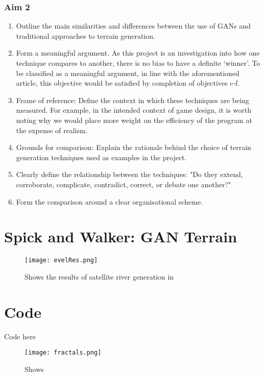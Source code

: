 \documentclass[a4paper]{report}
\begin{document}
\begin{appendices}
\subsubsection{Aim 2}
\begin{enumerate}
    \renewcommand{\theenumi}{\alph{enumi}}
    \item Outline the main similarities and differences between the use of GANs and traditional approaches to terrain generation.
    \item Form a meaningful argument. As this project is an investigation into how one technique compares to another, there is no bias to have a definite `winner'. To be classified as a meaningful argument, in line with the aforementioned article, this objective would be satisfied by completion of objectives c-f.
    \item Frame of reference: Define the context in which these techniques are being measured. For example, in the intended context of game design, it is worth noting why we would place more weight on the efficiency of the program at the expense of realism.
    \item Grounds for comparison: Explain the rationale behind the choice of terrain generation techniques used as examples in the project.
    \item Clearly define the relationship between the techniques: "Do they extend, corroborate, complicate, contradict, correct, or debate one another?" \cite{ToDo}
    \item Form the comparison around a clear organisational scheme.
    \end{enumerate}
\section{Spick and Walker: GAN Terrain}
\label{appendix:gan}
    \begin{figure}[H]
        \centering
            \texttt{[image: evelRes.png]}
            \caption{Shows the results of satellite river generation in \cite{riverSat}}
            \label{fig:elevRes}
    \end{figure}
\section{Code}
Code here

\begin{figure}[H]
    \centering
        \texttt{[image: fractals.png]}
        \caption{Shows }
        \label{fig:ToDo}
\end{figure}
\end{appendices}
\end{document}

